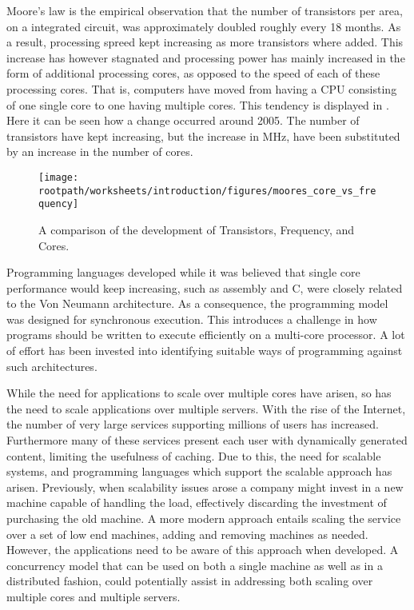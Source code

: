 \makeatletter {}\makeatother
{}
Moore's law\cite{moore1965cramming} is the empirical observation that the number of transistors per area, on a integrated circuit, was approximately doubled roughly every 18 months\cite[p. 203]{mack2011fifty}. As a result, processing spreed kept increasing as more transistors where added. This increase has however stagnated and processing power has mainly increased in the form of additional processing cores, as opposed to the speed of each of these processing cores\cite[p. 22]{sevenModels}. That is, computers have moved from having a \ac{CPU} consisting of one single core to one having multiple cores. This tendency is displayed in . Here it can be seen how a change occurred around 2005. The number of transistors have kept increasing, but the increase in MHz, have been substituted by an increase in the number of cores.
\label{chap:introduction}

\begin{figure}[htbp]
\centering
 \texttt{[image: \\rootpath/worksheets/introduction/figures/moores\_core\_vs\_frequency]} 
 \caption{A comparison of the development of Transistors, Frequency, and Cores\cite{isca2009}.}
\label{fig:moores_in_reality}
\end{figure}

Programming languages developed while it was believed that single core performance would keep increasing, such as assembly and C, were closely related to the Von Neumann architecture. As a consequence, the programming model was designed for synchronous execution. This introduces a challenge in how programs should be written to execute efficiently on a multi-core processor. A lot of effort has been invested into identifying suitable ways of programming against such architectures\cite{shavit1997software}\cite{haller2007actors}\cite{hewitt2014actor}\cite{scherer2005advanced}.

While the need for applications to scale over multiple cores have arisen, so has the need to scale applications over multiple servers. With the rise of the Internet, the number of very large services supporting millions of users has increased. Furthermore many of these services present each user with dynamically generated content, limiting the usefulness of caching. Due to this, the need for scalable systems, and programming languages which support the scalable approach has arisen. Previously, when scalability issues arose a company might invest in a new machine capable of handling the load, effectively discarding the investment of purchasing the old machine\cite[p. 2]{haller2007actors}. A more modern approach entails scaling the service over a set of low end machines, adding and removing machines as needed. However, the applications need to be aware of this approach when developed. A concurrency model that can be used on both a single machine as well as in a distributed fashion, could potentially assist in addressing both scaling over multiple cores and multiple servers.


